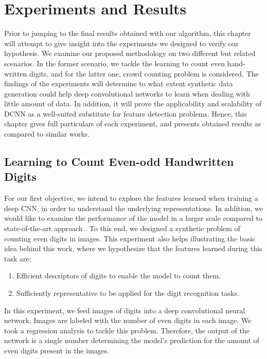 \newpage
\chapter{Experiments and Results}
\label{sec:experiments}

Prior to jumping to the final results obtained with our algorithm, this chapter will attempt to give insight into the experiments we designed to verify our hypothesis. We examine our proposed methodology on two different but related scenarios. In the former scenario, we tackle the learning to count even hand-written digits, and for the latter one, crowd counting problem is considered. The findings of the experiments will determine to what extent synthetic data generation could help deep convolutional networks to learn when dealing with little amount of data. In addition, it will prove the applicability and scalability of DCNN as a well-suited substitute for feature detection problems. Hence, this chapter gives full particulars of each experiment, and presents obtained results as compared to similar works.

\section{Learning to Count Even-odd Handwritten Digits}

For our first objective, we intend to explore the features learned when training a deep CNN, in order to understand the underlying representations. In addition, we would like to examine the performance of the model in a larger scale compared to state-of-the-art approach \cite{segui2015learning}. To this end, we designed a synthetic problem of counting even digits in images. This experiment also helps illustrating the basic idea behind this work, where we hypothesize that the features learned during this task are:
\begin{enumerate}
\item Efficient descriptors of digits to enable the model to count them.
\item Sufficiently representative to be applied for the digit recognition tasks.  
\end{enumerate}

In this experiment, we feed images of digits into a deep convolutional neural network. Images are labeled with the number of even digits in each image. We took a regression analysis to tackle this problem. Therefore, the output of the network is a single number determining the model's prediction for the amount of even digits present in the images. 
 

